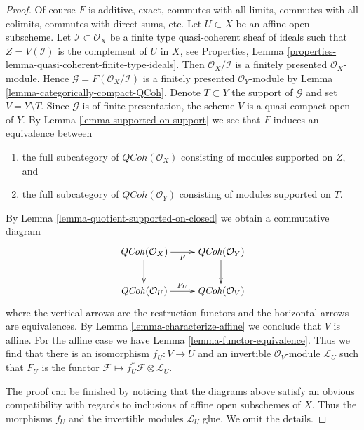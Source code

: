 \documentclass[10pt,a4paper]{amsart}
\theoremstyle{plain}
\theoremstyle{definition}
\theoremstyle{remark}
\numberwithin{equation}{subsection}
\def\QCoh{\mathit{QCoh}}
\begin{document}
\begin{proof}
Of course $F$ is additive, exact, commutes with all limits,
commutes with all colimits, commutes with direct sums, etc.
Let $U \subset X$ be an affine open subscheme.
Let $\mathcal{I} \subset \mathcal{O}_X$ be a finite type
quasi-coherent sheaf of ideals such that $Z = V(\mathcal{I})$
is the complement of $U$ in $X$, see
Properties, Lemma \ref{properties-lemma-quasi-coherent-finite-type-ideals}.
Then $\mathcal{O}_X/\mathcal{I}$ is a finitely presented
$\mathcal{O}_X$-module. Hence $\mathcal{G} = F(\mathcal{O}_X/\mathcal{I})$
is a finitely presented $\mathcal{O}_Y$-module by
Lemma \ref{lemma-categorically-compact-QCoh}.
Denote $T \subset Y$ the support of $\mathcal{G}$ and set
$V = Y \setminus T$. Since $\mathcal{G}$ is of finite presentation,
the scheme $V$ is a quasi-compact open of $Y$.
By Lemma \ref{lemma-supported-on-support} we see that $F$ induces an
equivalence between
\begin{enumerate}
\item the full subcategory of $\QCoh(\mathcal{O}_X)$ consisting
of modules supported on $Z$, and
\item the full subcategory of $\QCoh(\mathcal{O}_Y)$ consisting
of modules supported on $T$.
\end{enumerate}
By Lemma \ref{lemma-quotient-supported-on-closed} we obtain a commutative
diagram
$$
\xymatrix{
\QCoh(\mathcal{O}_X) \ar[r]_F \ar[d] &
\QCoh(\mathcal{O}_Y) \ar[d] \\
\QCoh(\mathcal{O}_U) \ar[r]^{F_U} &
\QCoh(\mathcal{O}_V)
}
$$
where the vertical arrows are the restruction functors and the
horizontal arrows are equivalences. By Lemma \ref{lemma-characterize-affine}
we conclude that $V$ is affine. For the affine case we have
Lemma \ref{lemma-functor-equivalence}. Thus we find that there
is an isomorphism $f_U : V \to U$ and an invertible
$\mathcal{O}_V$-module $\mathcal{L}_U$ such that
$F_U$ is the functor
$\mathcal{F} \mapsto f_U^*\mathcal{F} \otimes \mathcal{L}_U$.

\medskip\noindent
The proof can be finished by noticing that the diagrams above
satisfy an obvious compatibility with regards to inclusions
of affine open subschemes of $X$. Thus the morphisms $f_U$ and the
invertible modules $\mathcal{L}_U$ glue. We omit the details.
\end{proof}
\end{document}
